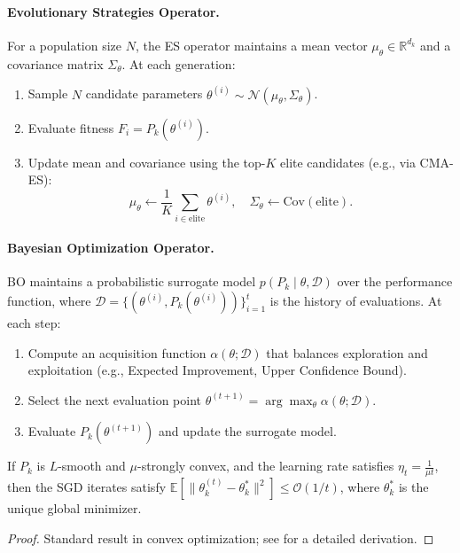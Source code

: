 \paragraph{Evolutionary Strategies Operator.} For a population size $N$, the ES operator maintains a mean vector $\mu_\theta \in \mathbb{R}^{d_k}$ and a covariance matrix $\Sigma_\theta$. At each generation:
\begin{enumerate}
    \item Sample $N$ candidate parameters $\theta^{(i)} \sim \mathcal{N}(\mu_\theta, \Sigma_\theta)$.
    \item Evaluate fitness $F_i = P_k(\theta^{(i)})$.
    \item Update mean and covariance using the top-$K$ elite candidates (e.g., via CMA-ES):
    \[
    \mu_\theta \leftarrow \frac{1}{K} \sum_{i \in \text{elite}} \theta^{(i)}, \quad
    \Sigma_\theta \leftarrow \text{Cov}(\text{elite}).
    \]
\end{enumerate}

\paragraph{Bayesian Optimization Operator.} BO maintains a probabilistic surrogate model $p(P_k \mid \theta, \mathcal{D})$ over the performance function, where $\mathcal{D} = \{(\theta^{(i)}, P_k(\theta^{(i)}))\}_{i=1}^t$ is the history of evaluations. At each step:
\begin{enumerate}
    \item Compute an acquisition function $\alpha(\theta; \mathcal{D})$ that balances exploration and exploitation (e.g., Expected Improvement, Upper Confidence Bound).
    \item Select the next evaluation point $\theta^{(t+1)} = \arg\max_\theta \alpha(\theta; \mathcal{D})$.
    \item Evaluate $P_k(\theta^{(t+1)})$ and update the surrogate model.
\end{enumerate}

\begin{proposition}
\label{prop:sgd_convergence}
If $P_k$ is $L$-smooth and $\mu$-strongly convex, and the learning rate satisfies $\eta_t = \frac{1}{\mu t}$, then the SGD iterates satisfy $\mathbb{E}[\|\theta_k^{(t)} - \theta_k^*\|^2] \le \mathcal{O}(1/t)$, where $\theta_k^*$ is the unique global minimizer.
\end{proposition}
\begin{proof}
Standard result in convex optimization; see \cite{sutton2018} for a detailed derivation.
\end{proof}

